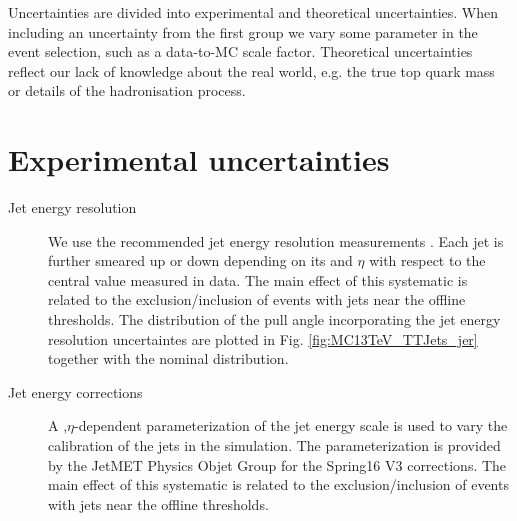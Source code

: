 Uncertainties are divided into experimental and theoretical uncertainties. When including an uncertainty from the first group we vary some parameter in the event selection, such as a data-to-MC scale factor. Theoretical uncertainties reflect our lack of knowledge about the real world, e.g. the true top quark mass or details of the hadronisation process.

\section{Experimental uncertainties}
\begin{description}
\item[Jet energy resolution] We use the recommended jet energy resolution measurements \cite{twiki:JER}. Each jet is further smeared up or down depending on its \pt and $\eta$ with respect to the central value measured in data. The main effect of this systematic is related to the exclusion/inclusion of events with jets near the offline thresholds. The distribution of the pull angle incorporating the jet energy resolution uncertaintes are plotted in Fig. \ref{fig:MC13TeV_TTJets_jer} together with the nominal distribution.

\item[Jet energy corrections] A \pt,$\eta$-dependent parameterization of the jet energy scale is used to vary the calibration of the jets in the simulation. The parameterization is provided by the JetMET Physics Objet Group \cite{twiki:JES} for the Spring16 V3 corrections. The main effect of this systematic is related to the exclusion/inclusion of events with jets near the offline thresholds.


\end{description}
